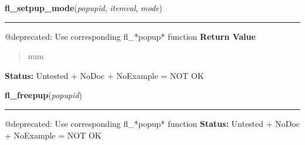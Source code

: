     \label{xformslib:deprecated:fl_setpup_mode}

    \vspace{0.5ex}

\hspace{.8\funcindent}\begin{boxedminipage}{\funcwidth}

    \raggedright \textbf{fl\_setpup\_mode}(\textit{popupid}, \textit{itemval}, \textit{mode})

    \vspace{-1.5ex}

    \rule{\textwidth}{0.5\fboxrule}
\setlength{\parskip}{2ex}

@deprecated: Use corresponding fl\_*popup* function
\setlength{\parskip}{1ex}
      \textbf{Return Value}
    \vspace{-1ex}

      \begin{quote}

num
      \end{quote}

\textbf{Status:} 
Untested + NoDoc + NoExample = NOT OK


    \end{boxedminipage}

    \label{xformslib:deprecated:fl_freepup}

    \vspace{0.5ex}

\hspace{.8\funcindent}\begin{boxedminipage}{\funcwidth}

    \raggedright \textbf{fl\_freepup}(\textit{popupid})

    \vspace{-1.5ex}

    \rule{\textwidth}{0.5\fboxrule}
\setlength{\parskip}{2ex}

@deprecated: Use corresponding fl\_*popup* function
\setlength{\parskip}{1ex}
\textbf{Status:} 
Untested + NoDoc + NoExample = NOT OK


    \end{boxedminipage}

    \label{xformslib:deprecated:fl_dopup}


